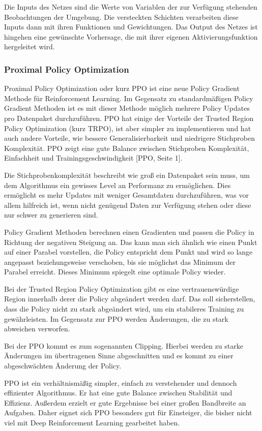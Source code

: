 Die Inputs des Netzes sind die Werte von Variablen der zur Verfügung stehenden Beobachtungen der Umgebung. Die versteckten Schichten verarbeiten diese Inputs dann mit ihren Funktionen und Gewichtungen. Das Output des Netzes ist hingehen eine gewünschte Vorhersage, die mit ihrer eigenen Aktivierungsfunktion hergeleitet wird.
\subsubsection{Proximal Policy Optimization}
Proximal Policy Optimization oder kurz PPO ist eine neue Policy Gradient Methode für Reinforcement Learning. Im Gegensatz zu standardmäßigen Policy Gradient Methoden ist es mit dieser Methode möglich mehrere Policy Updates pro Datenpaket durchzuführen. PPO hat einige der Vorteile der Trusted Region Policy Optimization (kurz TRPO), ist aber simpler zu implementieren und hat auch andere Vorteile, wie bessere Generalisierbarkeit und niedrigere Stichproben Komplexität. PPO zeigt eine gute Balance zwischen Stichproben Komplexität, Einfachheit und Trainingsgeschwindigkeit [PPO, Seite 1].

Die Stichprobenkomplexität beschreibt wie groß ein Datenpaket sein muss, um dem Algorithmus ein gewisses Level an Performanz zu ermöglichen. Dies ermöglicht es mehr Updates mit weniger Gesamtdaten durchzuführen, was vor allem hilfreich ist, wenn nicht genügend Daten zur Verfügung stehen oder diese nur schwer zu generieren sind.

Policy Gradient Methoden berechnen einen Gradienten und passen die Policy in Richtung der negativen Steigung an. Das kann man sich ähnlich wie einen Punkt auf einer Parabel vorstellen, die Policy entspricht dem Punkt und wird so lange angepasst beziehungsweise verschoben, bis sie möglichst das Minimum der Parabel erreicht. Dieses Minimum spiegelt eine optimale Policy wieder.

Bei der Trusted Region Policy Optimization gibt es eine vertrauenswürdige Region innerhalb derer die Policy abgeändert werden darf. Das soll sicherstellen, dass die Policy nicht zu stark abgeändert wird, um ein stabileres Training zu gewährleisten. Im Gegensatz zur PPO werden Änderungen, die zu stark abweichen verworfen.

Bei der PPO kommt es zum sogenannten Clipping. Hierbei werden zu starke Änderungen im übertragenen Sinne abgeschnitten und es kommt zu einer abgeschwächten Änderung der Policy.

PPO ist ein verhältnismäßig simpler, einfach zu verstehender und dennoch effizienter Algorithmus. Er hat eine gute Balance zwischen Stabilität und Effizienz. Außerdem erzielt er gute Ergebnisse bei einer großen Bandbreite an Aufgaben. Daher eignet sich PPO besonders gut für Einsteiger, die bisher nicht viel mit Deep Reinforcement Learning gearbeitet haben.
